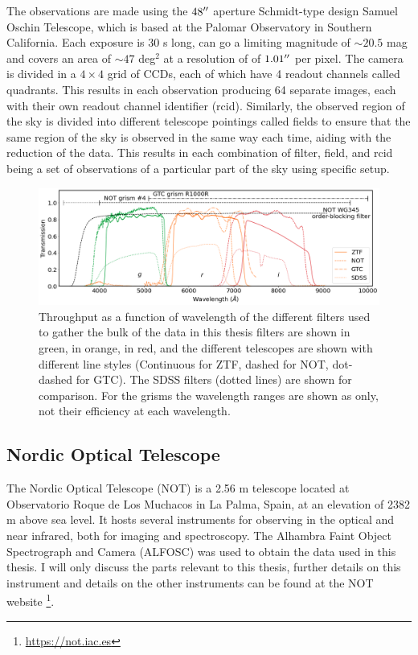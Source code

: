 \documentclass[a4paper,oneside,12pt, class=Latex/Classes/PhDthesisPSnPDF, crop=false]{standalone}
\begin{document}
The observations are made using the $48^{\prime\prime}$ aperture Schmidt-type design Samuel Oschin Telescope, which is based at the Palomar Observatory in Southern California. Each exposure is 30 s long, can go a limiting magnitude of $\sim20.5$ mag and covers an area of $\sim47$ deg$^2$ at a resolution of of $1.01^{\prime\prime}$ per pixel. The camera is divided in a $4\times4$ grid of CCDs, each of which have 4 readout channels called quadrants. This results in each observation producing 64 separate images, each with their own readout channel identifier (rcid). Similarly, the observed region of the sky is divided into different telescope pointings called fields to ensure that the same region of the sky is observed in the same way each time, aiding with the reduction of the data. This results in each combination of filter, field, and rcid being a set of observations of a particular part of the sky using specific setup.

\begin{figure}
    \centering
    \includegraphics[width=\textwidth]{../Images/chapter_2/transmissions.png}
    \caption{Throughput as a function of wavelength of the different filters used to gather the bulk of the data in this thesis \ztfg filters are shown in green, \ztfr in orange, \ztfi in red, and the different telescopes are shown with different line styles (Continuous for ZTF, dashed for NOT, dot-dashed for GTC). The SDSS filters (dotted lines) are shown for comparison. For the grisms the wavelength ranges are shown as only, not their efficiency at each wavelength.}
    \label{Optical_elements_plot}
\end{figure}


\subsection{Nordic Optical Telescope}
The Nordic Optical Telescope (NOT) is a 2.56 m telescope located at Observatorio Roque de Los Muchacos in La Palma, Spain, at an elevation of 2382 m above sea level. It hosts several instruments for observing in the optical and near infrared, both for imaging and spectroscopy. The Alhambra Faint Object Spectrograph and Camera (ALFOSC) was used to obtain the data used in this thesis. I will only discuss the parts relevant to this thesis, further details on this instrument and  details on the other instruments can be found at the NOT website \footnote{\url{https://not.iac.es}}.
\end{document}
